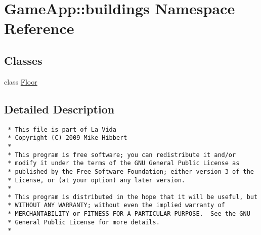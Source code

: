 \hypertarget{namespaceGameApp_1_1buildings}{
\section{GameApp::buildings Namespace Reference}
\label{namespaceGameApp_1_1buildings}
}


\subsection*{Classes}
\begin{CompactItemize}
\item 
class \hyperlink{classGameApp_1_1buildings_1_1Floor}{Floor}
\end{CompactItemize}


\subsection{Detailed Description}


\footnotesize\begin{verbatim}
 * This file is part of La Vida
 * Copyright (C) 2009 Mike Hibbert
 *
 * This program is free software; you can redistribute it and/or
 * modify it under the terms of the GNU General Public License as
 * published by the Free Software Foundation; either version 3 of the
 * License, or (at your option) any later version.
 *
 * This program is distributed in the hope that it will be useful, but
 * WITHOUT ANY WARRANTY; without even the implied warranty of
 * MERCHANTABILITY or FITNESS FOR A PARTICULAR PURPOSE.  See the GNU
 * General Public License for more details.
 *
\end{verbatim}
\normalsize
 